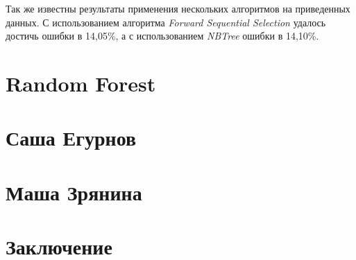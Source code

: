 \documentclass[12pt,a4paper]{article}
\begin{document}
Так же известны результаты применения нескольких алгоритмов на приведенных данных. С использованием алгоритма {\it Forward Sequential Selection} \cite{langley+sage} удалось достичь ошибки в 14,05\%, а с использованием {\it NBTree} \cite{kohavi} ошибки в 14,10\%.

\section{Random Forest}
\label{sec:randomforest}

\section{Саша Егурнов}
\label{sec:sashaegurnov}

\section{Маша Зрянина}
\label{sec:mashazryanina}

\section{Заключение}
\label{sec:conclusion}



\end{document}
